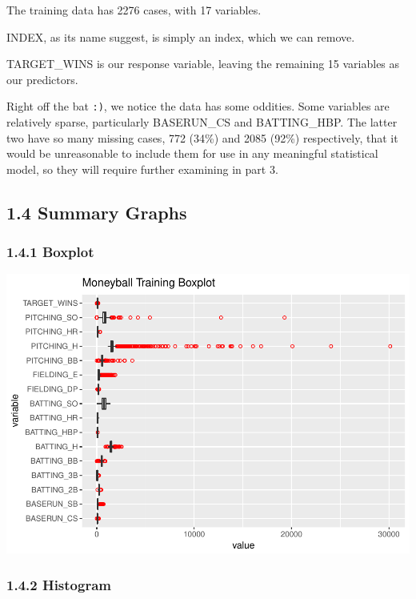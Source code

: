 \documentclass[]{article}
\begin{document}
The training data has 2276 cases, with 17 variables.

INDEX, as its name suggest, is simply an index, which we can remove.

TARGET\_WINS is our response variable, leaving the remaining 15
variables as our predictors.

Right off the bat \texttt{:)}, we notice the data has some oddities.
Some variables are relatively sparse, particularly BASERUN\_CS and
BATTING\_HBP. The latter two have so many missing cases, 772 (34\%) and
2085 (92\%) respectively, that it would be unreasonable to include them
for use in any meaningful statistical model, so they will require
further examining in part 3.

\subsection{1.4 Summary Graphs}\label{summary-graphs}

\subsubsection{1.4.1 Boxplot}\label{boxplot}

\includegraphics{DATA_621_Homework_1_files/figure-latex/summary-graph-boxplot-1.pdf}

\subsubsection{1.4.2 Histogram}\label{histogram}
\end{document}
